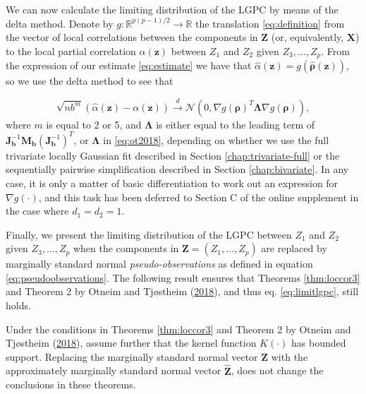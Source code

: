 \documentclass[
  12pt,
  letterpaper]{article}
\newcommand{\X}{\bm{X}}
\newcommand{\Z}{\bm{Z}}
\newcommand{\z}{\bm{z}}
\newcommand{\hZ}{\widehat{\bm{Z}}}
\newcommand{\frho}{\bm{\rho}}
\newcommand{\hfrho}{\widehat{\bm{\rho}}}
\newcommand{\hh}{\bm{b}}
\newcommand{\halpha}{\widehat{\alpha}}
\newcommand{\fLambda}{\bm{\Lambda}}
\newcommand{\Jb}{\bm{J}_{\hh}}
\newcommand{\Mb}{\bm{M}_{\hh}}
\theoremstyle{definition}
\theoremstyle{definition}
\theoremstyle{definition}
\theoremstyle{remark}
\let\BeginKnitrBlock\begin \let\EndKnitrBlock\end
\begin{document}
We can now calculate the limiting distribution of the LGPC by means of the delta method. Denote by \(g: \mathbb{R}^{p(p-1)/2} \rightarrow \mathbb{R}\) the translation \eqref{eq:definition} from the vector of local correlations between the components in \(\Z\) (or, equivalently, \(\X\)) to the local partial correlation \(\alpha(\z)\) between \(Z_1\) and \(Z_2\) given \(Z_3, \ldots, Z_p\). From the expression of our estimate \eqref{eq:estimate} we have that \(\halpha(\z) = g(\hfrho(\z))\), so we use the delta method to see that

\begin{equation}
\sqrt{nb^m}\left(\halpha(\z) - \alpha(\z)\right) \stackrel{d}{\rightarrow} \mathcal{N}\left(0, \nabla g(\frho)^T\fLambda\nabla g(\frho)\right),
\label{eq:limitlgpc}
\end{equation}
where \(m\) is equal to 2 or 5, and \(\fLambda\) is either equal to the leading term of \(\Jb^{-1}\Mb(\Jb^{-1})^T\), or \(\fLambda\) in \eqref{eq:ot2018}, depending on whether we use the full trivariate locally Gaussian fit described in Section \ref{chap:trivariate-full} or the sequentially pairwise simplification described in Section \ref{chap:bivariate}. In any case, it is only a matter of basic differentiation to work out an expression for \(\nabla g(\cdot)\), and this task has been deferred to Section C of the online supplement in the case where \(d_1 = d_2 = 1\).

Finally, we present the limiting distribution of the LGPC between \(Z_1\) and \(Z_2\) given \(Z_3, \ldots, Z_p\) when the components in \(\Z = (Z_1, \ldots, Z_p)\) are replaced by marginally standard normal \emph{pseudo-observations} as defined in equation \eqref{eq:pseudoobservations}. The following result ensures that Theorems \ref{thm:loccor3} and Theorem 2 by Otneim and Tjøstheim (\protect\hyperlink{ref-otneim2017conditional}{2018}), and thus eq. \eqref{eq:limitlgpc}, still holds.

\vspace{.5cm}

\BeginKnitrBlock{theorem}
\protect\hypertarget{thm:pseudo}{}{\label{thm:pseudo} }Under the conditions in Theorems \ref{thm:loccor3} and Theorem 2 by Otneim and Tjøstheim (\protect\hyperlink{ref-otneim2017conditional}{2018}), assume further that the kernel function \(K(\cdot)\) has bounded support. Replacing the marginally standard normal vector \(\Z\) with the approximately marginally standard normal vector \(\hZ\), does not change the conclusions in these theorems.
\EndKnitrBlock{theorem}
\end{document}
